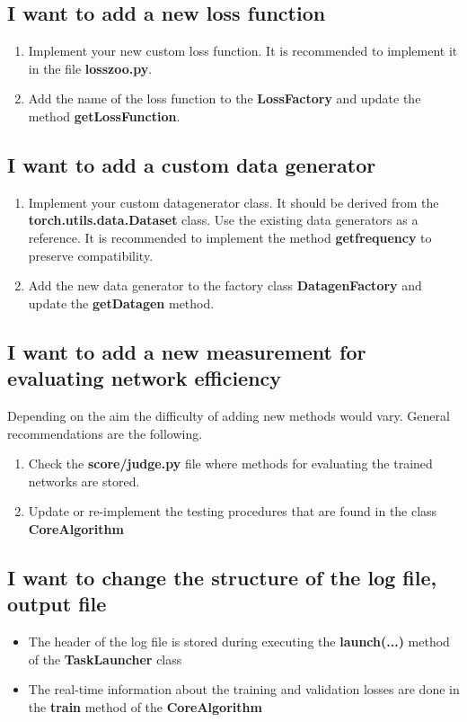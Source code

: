 \documentclass[a4paper, 11pt]{article}
\begin{document}
\subsection{I want to add a new loss function}
\label{myloss}
\begin{enumerate}
\item Implement your new custom loss function. It is recommended to implement it in the file \textbf{losszoo.py}. 
\item Add the name of the loss function to the \textbf{LossFactory} and update the method \textbf{getLossFunction}.
\end{enumerate}

\subsection{I want to add a custom data generator}
\begin{enumerate}
\item Implement your custom datagenerator class. It should be derived from the \textbf{torch.utils.data.Dataset} class. Use the existing data generators as a reference. 
It is recommended to implement the method \textbf{getfrequency} to preserve compatibility.
\item Add the new data generator to the factory class \textbf{DatagenFactory} and update the \textbf{getDatagen} method.
\end{enumerate}

\subsection{I want to add a new measurement for evaluating network efficiency}
Depending on the aim the difficulty of adding new methods would vary. General recommendations are the following.
\begin{enumerate}
\item Check the \textbf{score/judge.py} file where methods for evaluating the trained networks are stored. 
\item Update or re-implement the testing procedures that are found in the class \textbf{CoreAlgorithm}
\end{enumerate}

\subsection{I want to change the structure of the log file, output file}
\begin{itemize}
\item The header of the log file is stored during executing the \textbf{launch(...)} method of the \textbf{TaskLauncher} class
\item The real-time information about the training and validation losses are done in the \textbf{train} method of the \textbf{CoreAlgorithm}
\end{itemize}
\end{document}
